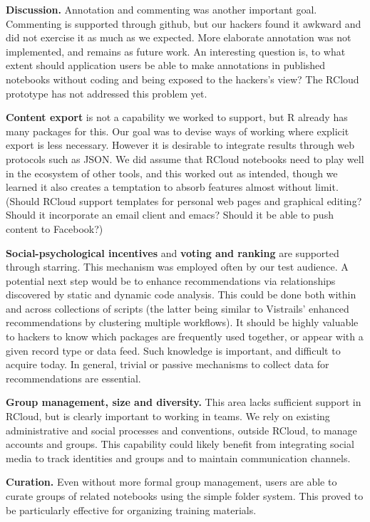 {\bf Discussion.} Annotation and commenting was another important goal.
Commenting is supported through github, but our hackers found it
awkward and did not exercise it as much as we expected.
More elaborate annotation was not implemented, and remains as future work.
An interesting question is, to what extent should application users
be able to make annotations in published notebooks without coding and
being exposed to the hackers's view?
The RCloud prototype has not addressed this problem yet.

{\bf Content export} is not a capability we worked to support,
but R already has many packages for this. Our goal was to devise
ways of working where explicit export is less necessary.
However it is desirable to integrate results
through web protocols such as JSON. We did assume that RCloud
notebooks need to play well in the ecosystem of other tools,
and this worked out as intended, though we learned it also creates
a temptation to absorb features almost without limit. (Should
RCloud support templates for personal web pages and graphical
editing? Should it incorporate an email client and emacs?
Should it be able to push content to Facebook?)

{\bf Social-psychological incentives} and {\bf voting and ranking}
are supported through starring. This mechanism was employed often
by our test audience. A potential next step would be to enhance
recommendations via relationships discovered by static and
dynamic code analysis. This could be done both within and across
collections of scripts (the latter being similar to Vistrails'
enhanced recommendations by clustering multiple workflows).
It should be highly valuable to hackers to know which packages
are frequently used together, or appear with a given record type
or data feed. Such knowledge is important, and difficult to acquire today.
In general, trivial or passive mechanisms to collect data for recommendations
are essential.

{\bf Group management, size and diversity.} This area lacks sufficient
support in RCloud, but is clearly important to working in teams.
We rely on existing administrative and social processes and conventions,
outside RCloud, to manage accounts and groups. This capability
could likely benefit from integrating social media to track
identities and groups and to maintain communication channels.

{\bf Curation.} Even without more formal group management, users are
able to curate groups of related notebooks using the simple folder
system. This proved to be particularly effective for organizing
training materials.

